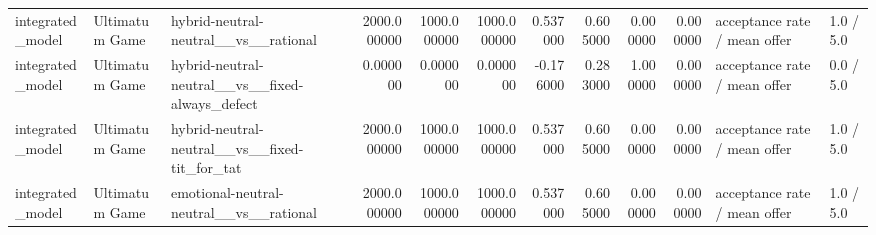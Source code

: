 \begin{tabular}{lllrrrrrrrll}
integrated\_model & Ultimatum Game & hybrid-neutral-neutral\_\_vs\_\_rational & 2000.000000 & 1000.000000 & 1000.000000 & 0.537000 & 0.605000 & 0.000000 & 0.000000 & acceptance rate / mean offer & 1.0 / 5.0 \\
integrated\_model & Ultimatum Game & hybrid-neutral-neutral\_\_vs\_\_fixed-always\_defect & 0.000000 & 0.000000 & 0.000000 & -0.176000 & 0.283000 & 1.000000 & 0.000000 & acceptance rate / mean offer & 0.0 / 5.0 \\
integrated\_model & Ultimatum Game & hybrid-neutral-neutral\_\_vs\_\_fixed-tit\_for\_tat & 2000.000000 & 1000.000000 & 1000.000000 & 0.537000 & 0.605000 & 0.000000 & 0.000000 & acceptance rate / mean offer & 1.0 / 5.0 \\
integrated\_model & Ultimatum Game & emotional-neutral-neutral\_\_vs\_\_rational & 2000.000000 & 1000.000000 & 1000.000000 & 0.537000 & 0.605000 & 0.000000 & 0.000000 & acceptance rate / mean offer & 1.0 / 5.0 \\
\bottomrule
\end{tabular}
